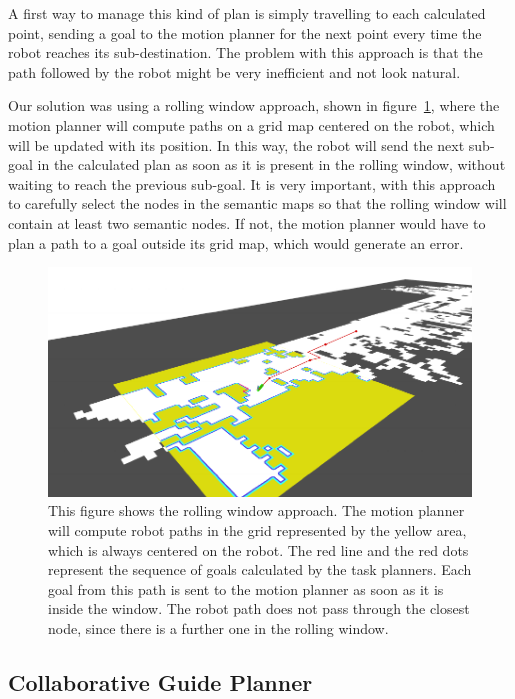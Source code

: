 A first way to manage this kind of plan is simply travelling to each calculated point, sending a goal to the motion planner for the next point every time the robot reaches its sub-destination. The problem with this approach is that the path followed by the robot might be very inefficient and not look natural.

Our solution was using a rolling window approach, shown in figure~\ref{fig:case_study-spencer-rolling_window}, where the motion planner will compute paths on a grid map centered on the robot, which will be updated with its position. In this way, the robot will send the next sub-goal in the calculated plan as soon as it is present in the rolling window, without waiting to reach the previous sub-goal. It is very important, with this approach to carefully select the nodes in the semantic maps so that the rolling window will contain at least two semantic nodes. If not, the motion planner would have to plan a path to a goal outside its grid map, which would generate an error.


\begin{figure}[ht!]
	\centering
	\includegraphics[]{img/case_study/spencer/rolling_window.pdf}
	\caption[Rolling window]{This figure shows the rolling window approach. The motion planner will compute robot paths in the grid represented by the yellow area, which is always centered on the robot. The red line and the red dots represent the sequence of goals calculated by the task planners. Each goal from this path is sent to the motion planner as soon as it is inside the window. The robot path does not pass through the closest node, since there is a further one in the rolling window.}
	\label{fig:case_study-spencer-rolling_window}
\end{figure}

\subsection{Collaborative Guide Planner }
\label{subsec:case_study-spencer-collaborative_guide_planner}

